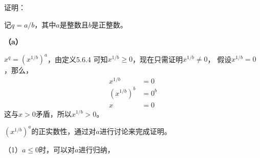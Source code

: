 \documentclass{article}
\theoremstyle{mystyle}
\begin{document}
证明：

记$q=a/b$，其中$a$是整数且$b$是正整数。

\textbf{（a）}

$x^q = (x^{1/b})^a$，由定义5.6.4 可知$x^{1/b} \geq 0$，现在只需证明$x^{1/b} \neq 0$，
假设$x^{1/b}=0$，那么，
\begin{align*}
  x^{1/b}     & = 0   \\
  (x^{1/b})^b & = 0^b \\
  x           & = 0
\end{align*}
这与$x>0$矛盾，所以$x^{1/b} > 0$。

$(x^{1/b})^a$的正实数性，通过对$a$进行讨论来完成证明。

（1）$a \leq 0$时，可以对$a$进行归纳，
\end{document}
